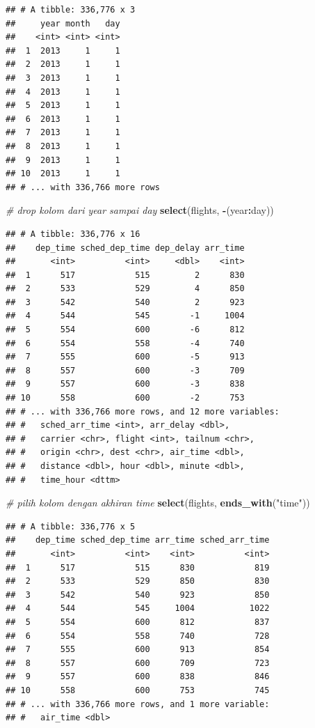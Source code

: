 \documentclass[]{book}
\newenvironment{Shaded}{\begin{snugshade}}{\end{snugshade}}
\newcommand{\KeywordTok}[1]{\textcolor[rgb]{0.13,0.29,0.53}{\textbf{#1}}}
\newcommand{\StringTok}[1]{\textcolor[rgb]{0.31,0.60,0.02}{#1}}
\newcommand{\CommentTok}[1]{\textcolor[rgb]{0.56,0.35,0.01}{\textit{#1}}}
\newcommand{\OperatorTok}[1]{\textcolor[rgb]{0.81,0.36,0.00}{\textbf{#1}}}
\newcommand{\NormalTok}[1]{#1}
\begin{document}
\begin{verbatim}
## # A tibble: 336,776 x 3
##     year month   day
##    <int> <int> <int>
##  1  2013     1     1
##  2  2013     1     1
##  3  2013     1     1
##  4  2013     1     1
##  5  2013     1     1
##  6  2013     1     1
##  7  2013     1     1
##  8  2013     1     1
##  9  2013     1     1
## 10  2013     1     1
## # ... with 336,766 more rows
\end{verbatim}

\begin{Shaded}
\begin{Highlighting}[]
\CommentTok{# drop kolom dari year sampai day}
\KeywordTok{select}\NormalTok{(flights, }\OperatorTok{-}\NormalTok{(year}\OperatorTok{:}\NormalTok{day))}
\end{Highlighting}
\end{Shaded}

\begin{verbatim}
## # A tibble: 336,776 x 16
##    dep_time sched_dep_time dep_delay arr_time
##       <int>          <int>     <dbl>    <int>
##  1      517            515         2      830
##  2      533            529         4      850
##  3      542            540         2      923
##  4      544            545        -1     1004
##  5      554            600        -6      812
##  6      554            558        -4      740
##  7      555            600        -5      913
##  8      557            600        -3      709
##  9      557            600        -3      838
## 10      558            600        -2      753
## # ... with 336,766 more rows, and 12 more variables:
## #   sched_arr_time <int>, arr_delay <dbl>,
## #   carrier <chr>, flight <int>, tailnum <chr>,
## #   origin <chr>, dest <chr>, air_time <dbl>,
## #   distance <dbl>, hour <dbl>, minute <dbl>,
## #   time_hour <dttm>
\end{verbatim}

\begin{Shaded}
\begin{Highlighting}[]
\CommentTok{# pilih kolom dengan akhiran time}
\KeywordTok{select}\NormalTok{(flights, }\KeywordTok{ends_with}\NormalTok{(}\StringTok{"time"}\NormalTok{))}
\end{Highlighting}
\end{Shaded}

\begin{verbatim}
## # A tibble: 336,776 x 5
##    dep_time sched_dep_time arr_time sched_arr_time
##       <int>          <int>    <int>          <int>
##  1      517            515      830            819
##  2      533            529      850            830
##  3      542            540      923            850
##  4      544            545     1004           1022
##  5      554            600      812            837
##  6      554            558      740            728
##  7      555            600      913            854
##  8      557            600      709            723
##  9      557            600      838            846
## 10      558            600      753            745
## # ... with 336,766 more rows, and 1 more variable:
## #   air_time <dbl>
\end{verbatim}
\end{document}

